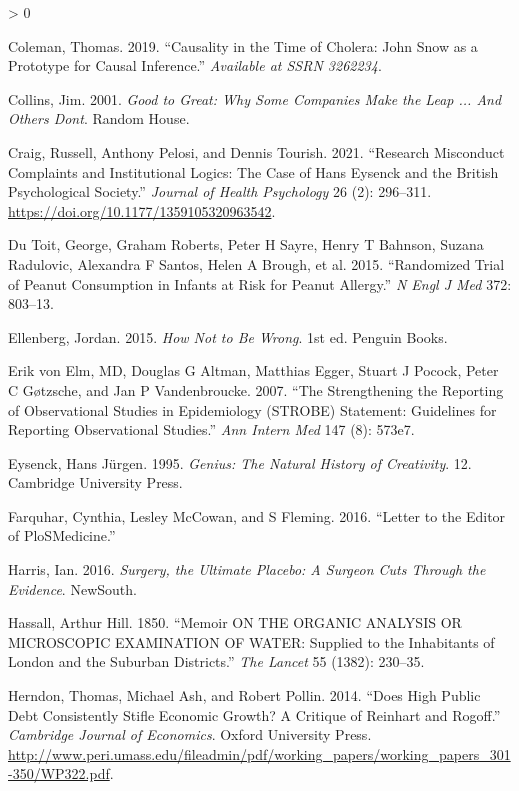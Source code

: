 \documentclass[
  10pt,
  b5paper]{book}
\newlength{\cslhangindent}
\newenvironment{CSLReferences}[2] %
 {%
  \setlength{\parindent}{0pt}
  \ifodd #1 \everypar{\setlength{\hangindent}{\cslhangindent}}\ignorespaces\fi
  \ifnum #2 > 0
  \setlength{\parskip}{#2\baselineskip}
  \fi
 }%
 {}
\begin{document}
\begin{CSLReferences}{1}{0}
\leavevmode\hypertarget{ref-coleman2019causality}{}%
Coleman, Thomas. 2019. {``Causality in the Time of Cholera: John {S}now as a Prototype for Causal Inference.''} \emph{Available at SSRN 3262234}.

\leavevmode\hypertarget{ref-collins_2001}{}%
Collins, Jim. 2001. \emph{Good to Great: Why Some Companies Make the Leap ... And Others Dont}. Random House.

\leavevmode\hypertarget{ref-CraigEtAl}{}%
Craig, Russell, Anthony Pelosi, and Dennis Tourish. 2021. {``Research Misconduct Complaints and Institutional Logics: The Case of Hans Eysenck and the British Psychological Society.''} \emph{Journal of Health Psychology} 26 (2): 296--311. \url{https://doi.org/10.1177/1359105320963542}.

\leavevmode\hypertarget{ref-du2015randomized}{}%
Du Toit, George, Graham Roberts, Peter H Sayre, Henry T Bahnson, Suzana Radulovic, Alexandra F Santos, Helen A Brough, et al. 2015. {``Randomized Trial of Peanut Consumption in Infants at Risk for Peanut Allergy.''} \emph{N Engl J Med} 372: 803--13.

\leavevmode\hypertarget{ref-ellenberg_2015}{}%
Ellenberg, Jordan. 2015. \emph{How Not to Be Wrong}. 1st ed. Penguin Books.

\leavevmode\hypertarget{ref-erik2007strengthening}{}%
Erik von Elm, MD, Douglas G Altman, Matthias Egger, Stuart J Pocock, Peter C Gøtzsche, and Jan P Vandenbroucke. 2007. {``The Strengthening the Reporting of Observational Studies in Epidemiology (STROBE) Statement: Guidelines for Reporting Observational Studies.''} \emph{Ann Intern Med} 147 (8): 573e7.

\leavevmode\hypertarget{ref-eysenck1995genius}{}%
Eysenck, Hans Jürgen. 1995. \emph{Genius: The Natural History of Creativity}. 12. Cambridge University Press.

\leavevmode\hypertarget{ref-farquhar2016letter}{}%
Farquhar, Cynthia, Lesley McCowan, and S Fleming. 2016. {``Letter to the Editor of PloSMedicine.''}

\leavevmode\hypertarget{ref-harris2016book}{}%
Harris, Ian. 2016. \emph{Surgery, the Ultimate Placebo: A Surgeon Cuts Through the Evidence}. NewSouth.

\leavevmode\hypertarget{ref-hassall1850memoir}{}%
Hassall, Arthur Hill. 1850. {``Memoir ON THE ORGANIC ANALYSIS OR MICROSCOPIC EXAMINATION OF WATER: Supplied to the Inhabitants of London and the Suburban Districts.''} \emph{The Lancet} 55 (1382): 230--35.

\leavevmode\hypertarget{ref-herndon2014does}{}%
Herndon, Thomas, Michael Ash, and Robert Pollin. 2014. {``Does High Public Debt Consistently Stifle Economic Growth? A Critique of Reinhart and Rogoff.''} \emph{Cambridge Journal of Economics}. Oxford University Press. \url{http://www.peri.umass.edu/fileadmin/pdf/working_papers/working_papers_301-350/WP322.pdf}.


\end{CSLReferences}
\end{document}
